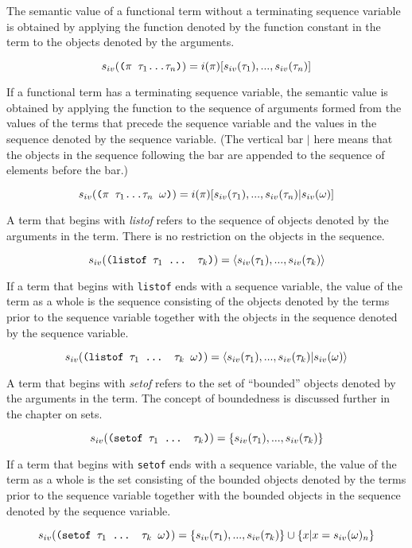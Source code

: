 The semantic value of a functional term without a terminating sequence
variable is obtained by applying the function denoted by the function constant
in the term to the objects denoted by the arguments.

$$s_{iv}(\hbox{\tt ($\pi$
$\tau_1$...$\tau_n$)})=i(\pi)[s_{iv}(\tau_1),...,s_{iv}(\tau_n)]$$

If a functional term has a terminating sequence variable, the semantic
value is obtained by applying the function to the sequence of arguments formed
from the values of the terms that precede the sequence variable and the values
in the sequence denoted by the sequence variable.  (The vertical bar $|$ here means
that the objects in the sequence following the bar are appended to the sequence of
elements before the bar.)

$$s_{iv}(\hbox{\tt ($\pi$ $\tau_1$...$\tau_n$ $\omega$)})=
i(\pi)[s_{iv}(\tau_1),...,s_{iv}(\tau_n)|s_{iv}(\omega)]$$

A term that begins with {\it listof} refers to the sequence of objects denoted by
the arguments in the term.  There is no restriction on the objects in the
sequence.

$$s_{iv}(\hbox{\tt (listof $\tau_1$ ... $\tau_k$)})=\langle
s_{iv}(\tau_1),...,s_{iv}(\tau_k)\rangle$$

If a term that begins with {\tt listof} ends with a sequence variable, the value of
the term as a whole is the sequence consisting of the objects denoted by the terms
prior to the sequence variable together with the objects in the sequence denoted by
the sequence variable.

$$s_{iv}(\hbox{\tt (listof $\tau_1$ ... $\tau_k$ $\omega$)})=\langle
s_{iv}(\tau_1),...,s_{iv}(\tau_k)|s_{iv}(\omega)\rangle$$

A term that begins with {\it setof} refers to the set of ``bounded'' objects denoted
by the arguments in the term.  The concept of boundedness is discussed further in the
chapter on sets.

$$s_{iv}(\hbox{\tt (setof
$\tau_1$ ... $\tau_k$)})=\{s_{iv}(\tau_1),...,s_{iv}(\tau_k)\}$$

If a term that begins with {\tt setof} ends with a sequence variable, the value of
the term as a whole is the set consisting of the bounded objects denoted by the terms
prior to the sequence variable together with the bounded objects in the sequence
denoted by the sequence variable.

$$s_{iv}(\hbox{\tt (setof $\tau_1$ ... $\tau_k$ $\omega$)})=\{
s_{iv}(\tau_1),...,s_{iv}(\tau_k)\}\cup\{x|x=s_{iv}(\omega)_n\}$$

